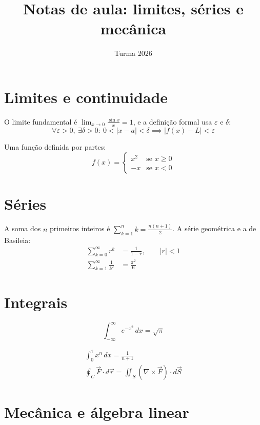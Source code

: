 \documentclass[12pt]{article}
\title{Notas de aula: limites, séries e mecânica}
\author{Turma 2026}
\begin{document}
\maketitle

\section{Limites e continuidade}

O limite fundamental é $\lim_{x \to 0} \frac{\sin x}{x} = 1$, e a definição
formal usa $\varepsilon$ e $\delta$:
\[
  \forall \varepsilon > 0,\ \exists \delta > 0 :\
  0 < |x - a| < \delta \implies |f(x) - L| < \varepsilon
\]

Uma função definida por partes:
\begin{equation}
  f(x) =
  \begin{cases}
    x^2          & \text{se } x \ge 0 \\
    -x           & \text{se } x < 0
  \end{cases}
\end{equation}

\section{Séries}

A soma dos $n$ primeiros inteiros é $\sum_{k=1}^{n} k = \frac{n(n+1)}{2}$.
A série geométrica e a de Basileia:
\begin{align*}
  \sum_{k=0}^{\infty} r^k &= \frac{1}{1 - r}, \qquad |r| < 1 \\
  \sum_{k=1}^{\infty} \frac{1}{k^2} &= \frac{\pi^2}{6}
\end{align*}

\section{Integrais}

$$ \int_{-\infty}^{\infty} e^{-x^2}\,dx = \sqrt{\pi} $$

\begin{gather}
  \int_0^1 x^n\,dx = \frac{1}{n + 1} \\
  \oint_C \vec{F} \cdot d\vec{r} = \iint_S (\nabla \times \vec{F}) \cdot d\vec{S}
\end{gather}

\section{Mecânica e álgebra linear}
\end{document}
